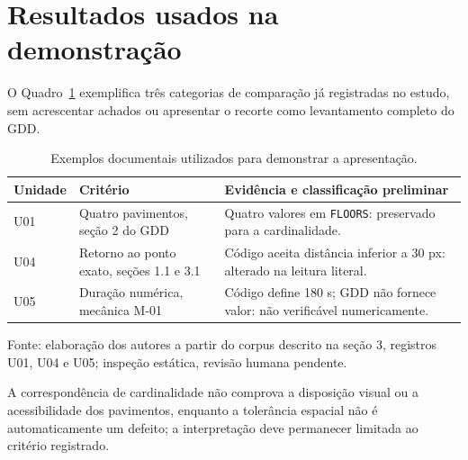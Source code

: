 \section{Resultados usados na demonstração}
O Quadro~\ref{quadro:piloto} exemplifica três categorias de comparação já registradas no estudo, sem acrescentar achados ou apresentar o recorte como levantamento completo do GDD.

\begin{table}[htbp]
\begin{singlespace}
\centering
\caption{Exemplos documentais utilizados para demonstrar a apresentação.}\label{quadro:piloto}
\begin{tabular}{p{}p{}p{}}
\toprule Unidade & Critério & Evidência e classificação preliminar \\
\midrule
U01 & Quatro pavimentos, seção 2 do GDD & Quatro valores em \texttt{FLOORS}: preservado para a cardinalidade.\\
U04 & Retorno ao ponto exato, seções 1.1 e 3.1 & Código aceita distância inferior a 30 px: alterado na leitura literal.\\
U05 & Duração numérica, mecânica M-01 & Código define 180 s; GDD não fornece valor: não verificável numericamente.\\
\bottomrule
\end{tabular}
\par\smallskip
\raggedright\footnotesize Fonte: elaboração dos autores a partir do corpus descrito na seção 3, registros U01, U04 e U05; inspeção estática, revisão humana pendente.
\end{singlespace}
\end{table}

A correspondência de cardinalidade não comprova a disposição visual ou a acessibilidade dos pavimentos, enquanto a tolerância espacial não é automaticamente um defeito; a interpretação deve permanecer limitada ao critério registrado.
